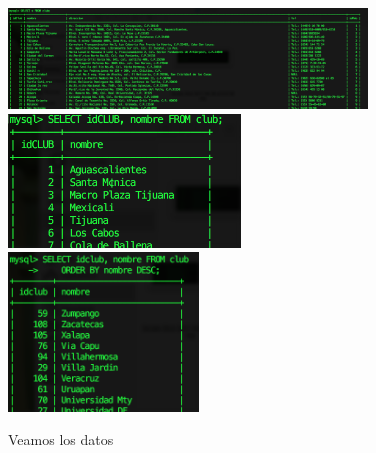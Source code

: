 \documentclass[12pt, fleqn]{article}                             %
\begin{document}
        \begin{figure}[h]
            \centering
            \includegraphics[width=0.85\textwidth]{DBExterna1}
            \includegraphics[width=0.55\textwidth]{DBExterna2}
            \includegraphics[width=0.45\textwidth]{DBExterna3}
            \caption{Veamos los datos}
        \end{figure}

        \clearpage
\end{document}
